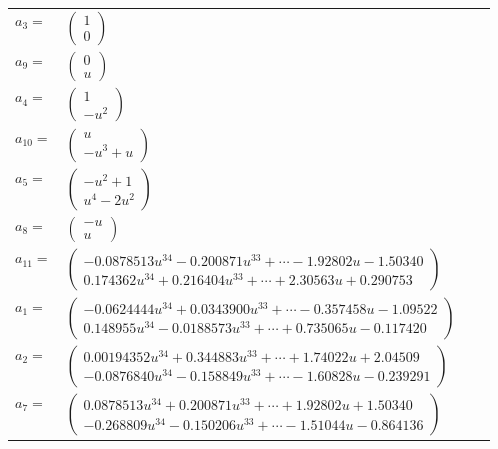 \documentclass[1p]{elsarticle_modified}
\theoremstyle{definition}
\begin{document}
\begin{tabular}{m{7pt} m{180pt} m{7pt} m{180pt} }
\flushright $a_{3}=$&$\begin{pmatrix}1\\0\end{pmatrix}$ \\
\flushright $a_{9}=$&$\begin{pmatrix}0\\u\end{pmatrix}$ \\
\flushright $a_{4}=$&$\begin{pmatrix}1\\- u^2\end{pmatrix}$ \\
\flushright $a_{10}=$&$\begin{pmatrix}u\\- u^3+u\end{pmatrix}$ \\
\flushright $a_{5}=$&$\begin{pmatrix}- u^2+1\\u^4-2 u^2\end{pmatrix}$ \\
\flushright $a_{8}=$&$\begin{pmatrix}- u\\u\end{pmatrix}$ \\
\flushright $a_{11}=$&$\begin{pmatrix}-0.0878513 u^{34}-0.200871 u^{33}+\cdots-1.92802 u-1.50340\\0.174362 u^{34}+0.216404 u^{33}+\cdots+2.30563 u+0.290753\end{pmatrix}$ \\
\flushright $a_{1}=$&$\begin{pmatrix}-0.0624444 u^{34}+0.0343900 u^{33}+\cdots-0.357458 u-1.09522\\0.148955 u^{34}-0.0188573 u^{33}+\cdots+0.735065 u-0.117420\end{pmatrix}$ \\
\flushright $a_{2}=$&$\begin{pmatrix}0.00194352 u^{34}+0.344883 u^{33}+\cdots+1.74022 u+2.04509\\-0.0876840 u^{34}-0.158849 u^{33}+\cdots-1.60828 u-0.239291\end{pmatrix}$ \\
\flushright $a_{7}=$&$\begin{pmatrix}0.0878513 u^{34}+0.200871 u^{33}+\cdots+1.92802 u+1.50340\\-0.268809 u^{34}-0.150206 u^{33}+\cdots-1.51044 u-0.864136\end{pmatrix}$ \\

\end{tabular}
\end{document}
